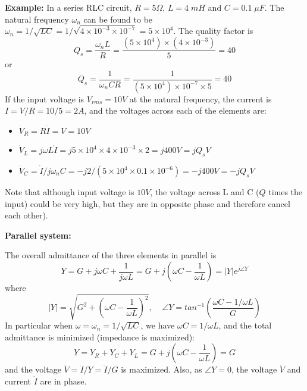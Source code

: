 \documentclass{article}
\begin{document}
\begin{comment}
and the admittances $Y=1/Z$ for different $Q$ ($R$) and $C$ are shown below.
The bandpass effect can be intuitively explained. When $\omega$ is high,
the inductor's impedance $\omega L$ is high, and when $\omega$ is low,
the capacitor's impedance $1/\omega C$ is high. When $\omega=\omega_n$
the overall impedance is the smallest. If the input is a voltage source 
$v(t)$, the current through the circuit will reach a maximum value when 
$\omega=\omega_n$.

\htmladdimg{../figures/omega0b.gif}
\htmladdimg{../figures/omega0a.gif}
\end{comment}

{\bf Example: } In a series RLC circuit, $R=5\Omega$, $L=4\;mH$ and
$C=0.1\;\mu F$. The natural frequency $\omega_n$ can be found to be
$\omega_n=1/\sqrt{LC}=1/\sqrt{4\times 10^{-3}\times 10^{-7}}=5\times 10^4$.
The quality factor is
\begin{equation}	
  Q_s=\frac{\omega_nL}{R}=\frac{(5\times 10^4)\times (4\times 10^{-3})}{5}
=40	
\end{equation}
or
\begin{equation}
  Q_s=\frac{1}{\omega_nCR}=\frac{1}{(5\times 10^4)\times 10^{-7}\times 5}
=40	
\end{equation}
If the input voltage is $V_{rms}=10V$ at the natural frequency, the current
is $I=V/R=10/5=2 A$, and the voltages across each of the elements are:
\begin{itemize}
\item $\dot{V}_R=R\dot{I}=V=10V$
\item $\dot{V}_L=j\omega L \dot{I}=j5\times 10^4\times 4\times 10^{-3} \times 2=j400V=jQ_sV$
\item $\dot{V}_C=\dot{I}/j\omega_nC=-j2/(5\times 10^4\times 0.1\times 10^{-6})=-j400V=-jQ_sV$
\end{itemize}
Note that although input voltage is $10V$, the voltage across L and C ($Q$ 
times the input) could be very high, but they are in opposite phase and 
therefore cancel each other).


{\bf Parallel system:} 


The overall admittance of the three elements in parallel is
\begin{equation} 
  Y=G+j\omega C+\frac{1}{j\omega L}=G+j\left(\omega C-\frac{1}{\omega L}\right)
  =|Y|e^{j\angle Y}	
\end{equation}
where
\begin{equation}
  |Y|=\sqrt{G^2+\left(\omega C-\frac{1}{\omega L}\right)^2},\;\;\;\;
  \angle Y=tan^{-1} \left(\frac{\omega C-1/\omega L}{G}\right) 
\end{equation}
In particular when $\omega=\omega_n=1/\sqrt{LC}$, we have 
$\omega C=1/\omega L$, and the total admittance is minimized
(impedance is maximized):
\begin{equation} 
  Y=Y_R+Y_C+Y_L=G+j\left(\omega C-\frac{1}{\omega L}\right)=G 
\end{equation}
and the voltage $\dot{V}=\dot{I}/Y=\dot{I}/G$ is maximized. Also, as 
$\angle Y=0$, the voltage $\dot{V}$ and current $\dot{I}$ are in phase.
\end{document}

